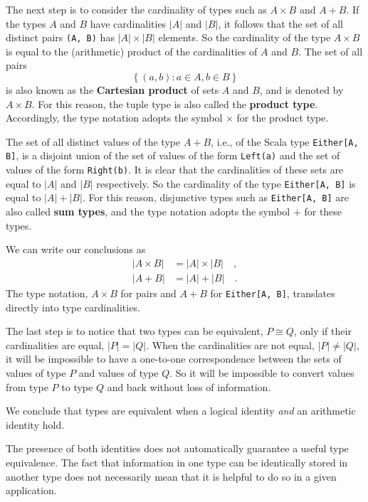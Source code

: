 The next step is to consider the cardinality of types such as $A\times B$
and $A+B$. If the types $A$ and $B$ have cardinalities $\left|A\right|$
and $\left|B\right|$, it follows that the set of all distinct pairs
\lstinline!(A, B)! has $\left|A\right|\times\left|B\right|$ elements.
So the cardinality of the type $A\times B$ is equal to the (arithmetic)
product of the cardinalities of $A$ and $B$. The set of all pairs
\[
\left\{ (a,b):a\in A,b\in B\right\} 
\]
is also known as the \textbf{Cartesian product}
of sets $A$ and $B$, and is denoted by $A\times B$. For this reason,
the tuple type is also called the \textbf{product
type}. Accordingly, the type notation adopts the symbol $\times$
for the product type.

The set of all distinct values of the type $A+B$, i.e., of the Scala
type \lstinline!Either[A, B]!, is a disjoint union of the set of
values of the form \lstinline!Left(a)! and the set of values of the
form \lstinline!Right(b)!. It is clear that the cardinalities of
these sets are equal to $\left|A\right|$ and $\left|B\right|$ respectively.
So the cardinality of the type \lstinline!Either[A, B]! is equal
to $\left|A\right|+\left|B\right|$. For this reason, disjunctive
types such as \lstinline!Either[A, B]! are also called \textbf{sum
types}, and the type notation adopts the symbol $+$ for these types.

We can write our conclusions as
\begin{align*}
\left|A\times B\right| & =\left|A\right|\times\left|B\right|\quad,\\
\left|A+B\right| & =\left|A\right|+\left|B\right|\quad.
\end{align*}
The type notation, $A\times B$ for pairs and $A+B$ for \lstinline!Either[A, B]!,
translates directly into type cardinalities.

The last step is to notice that two types can be equivalent, $P\cong Q$,
only if their cardinalities are equal, $\left|P\right|=\left|Q\right|$.
When the cardinalities are not equal, $\left|P\right|\neq\left|Q\right|$,
it will be impossible to have a one-to-one correspondence between
the sets of values of type $P$ and values of type $Q$. So it will
be impossible to convert values from type $P$ to type $Q$ and back
without loss of information.

We conclude that types are equivalent when a logical identity \emph{and}
an arithmetic identity hold.

The presence of both identities does not automatically guarantee a
useful type equivalence. The fact that information in one type can
be identically stored in another type does not necessarily mean that
it is helpful to do so in a given application.

